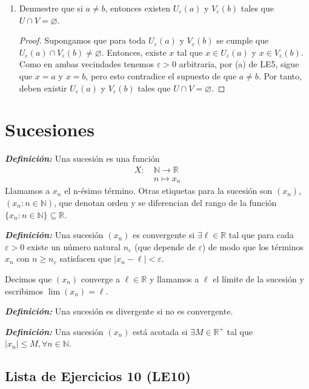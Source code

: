 \documentclass[11pt]{article}
\newcommand{\N}{\mathbb{N}}
\newcommand{\R}{\mathbb{R}}
\newcommand{\bfit}[1]{\textbf{\textit{#1}}}
\let\epsilon\varepsilon
\let\emptyset\varnothing
\begin{document}
\begin{enumerate}[label=\alph*)]
 \item Demuestre que si $a\neq b$, entonces existen $U_\varepsilon(a)$ y $V_\varepsilon(b)$ tales que $U\cap V =\emptyset$.
 \begin{proof} 
  Supongamos que para toda $U_\varepsilon(a)$ y $V_\varepsilon(b)$ se cumple que $U_\varepsilon(a) \cap V_\varepsilon(b) \neq \emptyset$. Entonces, existe $x$ tal que $x\in U_\varepsilon(a)$ y $x\in V_\varepsilon(b)$. Como en ambas vecindades tenemos $\epsilon>0$ arbitraria, por (a) de LE5, sigue que $x=a$ y $x=b$, pero esto contradice el supuesto de que $a\neq b$. Por tanto, deben existir $U_\varepsilon(a)$ y $V_\varepsilon(b)$ tales que $U\cap V =\emptyset$. 
 \end{proof}
\end{enumerate}

\section*{Sucesiones}

\bfit{Definición:}  Una sucesión es una función %
\begin{align*}
 X: \ & \N \to \R \\
 \ &  n \mapsto x_n 
\end{align*}
%
Llamamos a $x_n$ el n-ésimo término. Otras etiquetas para la sucesión son $(x_n)$, $(x_n:n\in \N)$, que denotan orden y se diferencian del rango de la función $\{x_n:n\in \N\}\subseteq \R$.

\bfit{Definición:}  Una sucesión $(x_n)$ es convergente si $\exists \ell \in \R$ tal que para cada $\varepsilon>0$ existe un número natural $n_\varepsilon$ (que depende de $\varepsilon$) de modo que los términos $x_n$ con $n\geq n_\varepsilon$ satisfacen que $|x_n-\ell|<\varepsilon$.

Decimos que $(x_n)$ converge a $\ell \in \R$ y llamamos a $\ell$ el límite de la sucesión y escribimos $\lim (x_n) = \ell$.

\bfit{Definición:}  Una sucesión es divergente si no es convergente.

\bfit{Definición:}  Una sucesión $(x_n)$ está acotada si $\exists M\in \R^+$ tal que $|x_n|\leq M, \forall n\in \N$.

\subsection*{Lista de Ejercicios 10 (LE10)}
\end{document}
